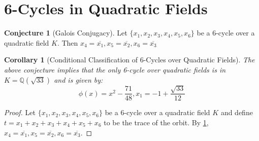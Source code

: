 \documentclass{amsart}
\theoremstyle{plain}
\newtheorem{corollary}[theorem]{Corollary}
\theoremstyle{definition}
\newtheorem{conjecture}[theorem]{Conjecture}
\theoremstyle{remark}
\newcommand{\Q}{\mathbb{Q}}
\begin{document}
\section{6-Cycles in Quadratic Fields}

\begin{conjecture}[Galois Conjugacy]
	\label{conj:gc}
	Let $\{x_1, x_2, x_3, x_4, x_5, x_6\}$ be a $6$-cycle over a 
	quadratic field $K$. Then 
	$x_4 = \overline{x_1}, x_5 = \overline{x_2}, x_6 = \overline{x_3}$
\end{conjecture}

\begin{corollary}[Conditional Classification of 6-Cycles over Quadratic Fields]
	The above conjecture implies that the only 6-cycle over quadratic fields is in $K = \Q(\sqrt{33})$ and is given by:
	\[
		\phi(x) = x^2 - \frac{71}{48}, x_1 = -1 + \frac{\sqrt{33}}{12}
	\]
\end{corollary}

\begin{proof}
	Let $\{x_1, x_2, x_3, x_4, x_5, x_6\}$ be a $6$-cycle over a 
	quadratic field $K$ and define $t = x_1 + x_2 + x_3 + x_4 + x_5 + x_6$
	to be the trace of the orbit. By \ref{conj:gc}, 
	$x_4 = \overline{x_1}, x_5 = \overline{x_2}, x_6 = \overline{x_3}$. 
\end{proof}
\end{document}
